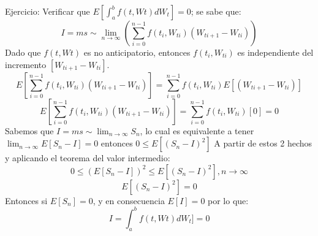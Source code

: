 \documentclass[11pt,fleqn]{book} %
\numberwithin{equation}{section} %
\numberwithin{figure}{section} %
\numberwithin{table}{section} %
\begin{document}
Ejercicio: Verificar que $E[\int_{a}^{b} f(t,Wt) dW_{t}] = 0 $; se sabe que:
$$ I = ms\sim \lim_{n \to \infty}(\sum_{i=0}^{n-1} f(t_{i},W_{ti})(W_{ti+1}-W_{ti})) $$
Dado que $f(t,Wt)$ es no anticipatorio, entonces $f(t_{i},W_{ti})$ es independiente del incremento $[W_{ti + 1} - W_{ti}]$.
$$ E[\sum_{i=0}^{n-1} f(t_{i},W_{ti})(W_{ti+1}-W_{ti})] = \sum_{i=0}^{n-1} f(t_{i},W_{ti})E[(W_{ti+1}-W_{ti})] $$
$$ E[\sum_{i=0}^{n-1} f(t_{i},W_{ti})(W_{ti+1}-W_{ti})] = \sum_{i=0}^{n-1} f(t_{i},W_{ti})[0] = 0$$
Sabemos que $I = ms\sim \lim_{n \to \infty} S_{n}$, lo cual es equivalente a tener $\lim_{n \to \infty} E[S_{n} - I] = 0$ entonces $0 \leq E[(S_{n} - I)^2]$
A partir de estos 2 hechos y aplicando el teorema del valor intermedio:
$$ 0 \leq (E[S_{n} - I])^2 \leq E[(S_{n} - I)^2], n \to \infty $$
$$ E[(S_{n} - I)^2] = 0 $$
Entonces si $ E[S_{n}] = 0$, y en consecuencia $ E[I] = 0 $ por lo que:
$$ I = \int_{a}^{b} f(t,Wt) dW_{t}] = 0 $$
\end{document}
